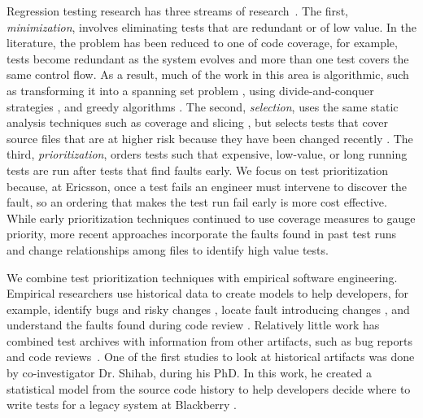 \documentclass[12pt, letterpaper]{article}
\begin{document}
Regression testing research has three streams of research~\cite{Yoo2012STVR}.
%
%
The first, {\it minimization}, involves eliminating tests that are redundant or
of low value. In the literature, the problem has been reduced to one of code
coverage, for example, tests become redundant as the system evolves and more
than one test covers the same control flow. As a result, much of the work in
this area is algorithmic, such as transforming it into a spanning set problem
\cite{Marre2003TSE}, using divide-and-conquer strategies \cite{Chen1996IPL},
and greedy algorithms \cite{Tallam2005SENotes}. 
%
The second, {\it selection}, uses the same static analysis techniques such as
coverage \cite{Taha1989COMPSAC} and slicing \cite{Jeffrey2006COMPSAC}, but
selects tests that cover source files that are at higher risk because they have
been changed recently \cite{Rothermel1994ICSE}. 
%
The third, {\it prioritization}, orders tests such that expensive, low-value,
or long running tests are run after tests that find faults early.  We
focus on test prioritization because, at Ericsson, once a test fails an
engineer must intervene to discover the fault, so an ordering that makes the
test run fail early is more cost effective.
While early prioritization techniques continued to use coverage measures to
gauge priority, more recent approaches incorporate the faults found in past
test runs \cite{Kim2002ICSE} and change relationships among files
\cite{Sherriff2007ISSRE} to identify high value tests. 

We combine test prioritization techniques with empirical software engineering.
Empirical researchers use historical data to create models to help developers,
for example, identify bugs and risky changes \cite{DAmbros2010MSR}, locate
fault introducing changes \cite{Kim2006ASE}, and understand the faults found
during code review \cite{Rigby2014TOSEM}.
Relatively little work has combined test archives with information from other
artifacts, such as bug reports and code
reviews~\cite{Shihab2011SPE,Herzig2014ISSRE}. One of the first studies to look
at historical artifacts was done by co-investigator Dr. Shihab, during his PhD.
In this work, he created a statistical model from the source code history to
help developers decide where to write tests for a legacy system at Blackberry
\cite{Shihab2011SPE}.
\end{document}
